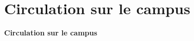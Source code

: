 \documentclass[xcolor=table]{beamer}
\begin{document}


\section{Circulation sur le campus}

\begin{frame}

\centering\Huge{\textbf{Circulation sur le campus}}

\end{frame}

\begin{frame}

\frametitle{}

\end{frame}
\end{document}
